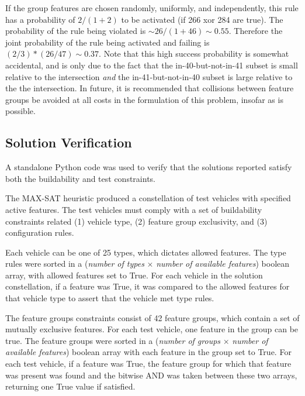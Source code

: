 \documentclass[aps,pra,twocolumn,superscriptaddress,groupedaddress]{revtex4}  %
\begin{document}
If the group features are chosen randomly, uniformly, and independently, this
rule has a probability of $2/(1+2)$ to be activated (if 266 xor 284 are true).
The probability of the rule being violated is $\sim 26/(1+46) \sim 0.55$.
Therefore the joint probability of the rule being activated and failing is
$(2/3) * (26/47) \sim 0.37$. Note that this high success probability is somewhat
accidental, and is only due to the fact that the in-40-but-not-in-41 subset is
small relative to the intersection \emph{and} the in-41-but-not-in-40 subset is
large relative to the the intersection. In future, it is recommended that
collisions between feature groups be avoided at all costs in the formulation of
this problem, insofar as is possible.

\subsection{Solution Verification}

A standalone Python code was used to verify that the solutions reported satisfy
both the buildability and test constraints.

The MAX-SAT heuristic produced a constellation of test vehicles with specified
active features. The test vehicles must comply with a set of buildability
constraints related (1) vehicle type, (2) feature group exclusivity, and
(3) configuration rules.

Each vehicle can be one of 25 types, which dictates allowed features. 
The type rules were sorted in a (\textit{number of types} $\times$
\textit{number of available features}) boolean array, with allowed features set
to True. For each vehicle in the solution constellation, if a feature was True,
it was compared to the allowed features for that vehicle type to assert that the
vehicle met type rules.

The feature groups constraints consist of 42 feature groups, which contain a set
of mutually exclusive features. For each test vehicle, one feature in the group can
be true. The feature groups were sorted in a (\textit{number of groups} $\times$
\textit{number of available features}) boolean array with each feature in the group
set to True. For each test vehicle, if a feature was True, the feature group for
which that feature was present was found and the bitwise AND was taken between
these two arrays, returning one True value if satisfied.
\end{document}
